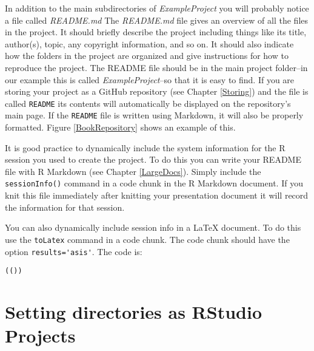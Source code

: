 In addition to the main subdirectories of {\emph{ExampleProject}} you will probably notice a file called {\emph{README.md}} The {\emph{README.md}} file gives an overview of all the files in the project. It should briefly describe the project including things like its title, author(s), topic, any copyright information, and so on. It should also indicate how the folders in the project are organized and give instructions for how to reproduce the project. The README file should be in the main project folder--in our example this is called {\emph{ExampleProject}}--so that it is easy to find. If you are storing your project as a GitHub repository (see Chapter \ref{Storing}) and the file is called \texttt{README} its contents will automatically be displayed on the repository's main page. If the \texttt{README} file is written using Markdown, it will also be properly formatted. Figure \ref{BookRepository} shows an example of this.

It is good practice to dynamically include the system information for the R session you used to create the project. To do this you can write your README file with R Markdown (see Chapter \ref{LargeDocs}). Simply include the \texttt{sessionInfo()} command in a code chunk in the R Markdown document. If you knit this file immediately after knitting your presentation document it will record the information for that session.

You can also dynamically include session info in a LaTeX document. To do this use the {\tt{toLatex}} command in a code chunk. The code chunk should have the option \verb|results='asis'|. The code is:

\begin{knitrout}
\color{fgcolor}\begin{kframe}
\begin{alltt}
(())
\end{alltt}
\end{kframe}
\end{knitrout}



\section{Setting directories as RStudio Projects}

